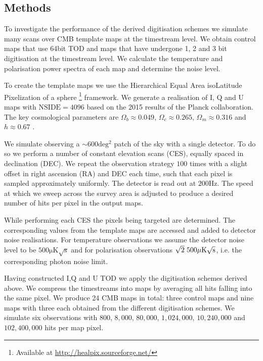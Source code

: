 \documentclass[apj]{emulateapj}
\begin{document}
\subsection{Methods}
\label{subsec:method}

To investigate the performance of the derived digitisation schemes we simulate many scans over CMB template maps at the timestream level. We obtain control maps that use 64bit TOD and maps that have undergone 1, 2 and 3 bit digitisation at the timestream level. We calculate the temperature and polarisation power spectra of each map and determine the noise level.

To create the template maps we use the Hierarchical Equal Area isoLatitude Pixelization of a sphere \citep[HEALPix;][]{healpix}\footnote{Available at \url{http://healpix.sourceforge.net/}} framework. We generate a realisation of I, Q and U maps with $\mathrm{NSIDE} = 4096$ based on the 2015 results of the Planck collaboration. The key cosmological parameters are $\Omega_b \approx 0.049 $, $\Omega_c \approx 0.265$, $\Omega_m \approx 0.316$ and $h \approx 0.67$ \citep{planck2016}.


We simulate observing a $\sim 600 \mathrm{deg^2}$ patch of the sky with a single detector. To do so we perform a number of constant elevation scans (CES), equally spaced in declination (DEC). We repeat the observation strategy $100$ times with a slight offset in right ascension (RA) and DEC each time, such that each pixel is sampled approximately uniformly. The detector is read out at $200 \mathrm{Hz}$. The speed at which we sweep across the survey area is adjusted to produce a desired number of hits per pixel in the output maps.

While performing each CES the pixels being targeted are determined. The corresponding values from the template maps are accessed and added to detector noise realisations. For temperature observations we assume the detector noise level to be $500 \mathrm{\mu K \sqrt{s}}$ and for polarisation observations $\sqrt{2} \hspace{0.7ex} 500 \mathrm{\mu K \sqrt{s}}$, i.e. the corresponding photon noise limit.

Having constructed I,Q and U TOD we apply the digitisation schemes derived above. We compress the timestreams into maps by averaging all hits falling into the same pixel. We produce 24 CMB maps in total: three control maps and nine maps with three each obtained from the different digitisation schemes. We simulate six observations with $800$, $8,000$, $80,000$, $1,024,000$, $10,240,000$ and $102,400,000$ hits per map pixel.
\end{document}

